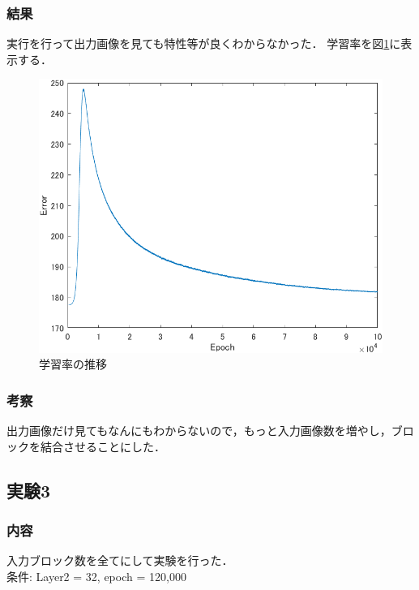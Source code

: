 \documentclass[twocolumn, a4j]{jsarticle}
\begin{document}
\subsubsection{結果}
実行を行って出力画像を見ても特性等が良くわからなかった．
学習率を図\ref{fig:3-6}に表示する．
\begin{figure}[h]
  \begin{center}
    \includegraphics[width=0.9\columnwidth]{figure/archive20241219-figure3-2.png}
  \end{center}
  \caption{学習率の推移}
  \label{fig:3-6}
\end{figure}
\subsubsection{考察}
出力画像だけ見てもなんにもわからないので，もっと入力画像数を増やし，ブロックを結合させることにした．

\subsection{実験3}
\subsubsection{内容}
入力ブロック数を全てにして実験を行った．
\\条件: Layer2 = 32, epoch = 120,000
\end{document}
